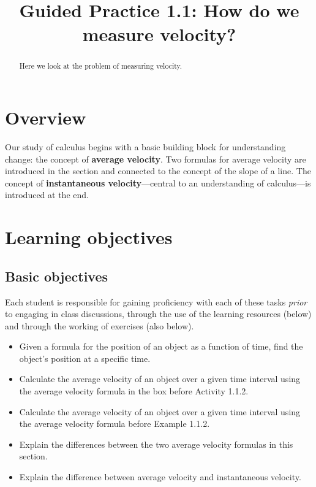 \documentclass{ximera}
\title{Guided Practice 1.1: How do we measure velocity?}
\begin{document}
  
\begin{abstract}  
  Here we look at the problem of measuring velocity.
\end{abstract}  
\maketitle

\section*{Overview}

Our study of calculus begins with a basic building block for
understanding change: the concept of \textbf{average velocity}. Two
formulas for average velocity are introduced in the section and
connected to the concept of the slope of a line. The concept of
\textbf{instantaneous velocity}---central to an understanding of
calculus---is introduced at the end.\par

\section*{Learning objectives}
\subsection*{Basic objectives}

Each student is responsible for gaining proficiency with each of these
tasks \emph{prior} to engaging in class discussions, through the use
of the learning resources (below) and through the working of exercises
(also below).

\begin{itemize}
\item Given a formula for the position of an object as a function of
  time, find the object's position at a specific time.
\item Calculate the average velocity of an object over a given time
  interval using the average velocity formula in the box before
  Activity 1.1.2.
\item Calculate the average velocity of an object over a given time
  interval using the average velocity formula before Example 1.1.2.
\item Explain the differences between the two average velocity
  formulas in this section.
\item Explain the difference between average velocity and
  instantaneous velocity.
\end{itemize}
\end{document}
